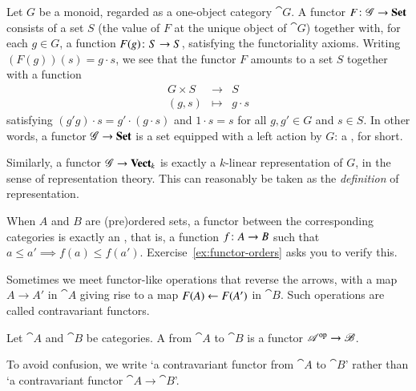 \begin{example}
\label{eg:functor-action}
Let $G$ be a monoid,%
%
%
regarded as a one-object category $\cat{G}$.  A functor $F\from \cat{G} \to
\Set$ consists of a set $S$ (the value of $F$ at the unique object of
$\cat{G}$) together with, for each $g \in G$, a function $F(g)\from S \to
S$, satisfying the functoriality axioms.  Writing $(F(g))(s) = g \cdot s$,
we see that the functor $F$ amounts to a set $S$ together with a function
\[
\begin{array}{ccc}
G \times S      &\to            &S      \\
(g, s)          &\mapsto        &g \cdot s      
\end{array}
\]
satisfying $(g' g) \cdot s = g' \cdot (g \cdot s)$ and $1 \cdot s = s$ for
all $g, g' \in G$ and $s \in S$.  In other words, a functor $\mathscr{G} \to
\mathbf{Set}$ is a set equipped with a left action by $G$: a ,%
%
%
for short.

Similarly, a functor $\mathscr{G} \to \mathbf{Vect}_k$ is exactly a $k$-linear
representation%
%
%
of $G$, in the sense of representation theory.  This can reasonably be
taken as the \emph{definition} of representation.
\end{example}

\begin{example}
\label{eg:functor-orders}
When $A$ and $B$ are (pre)ordered sets, a functor between the corresponding
categories is exactly an , that is, a function
$f\from A \to B$ such that $a \leq a' \implies f(a) \leq f(a')$.
Exercise~\ref{ex:functor-orders} asks you to verify this.
\end{example}

Sometimes we meet functor-like operations that reverse the arrows, with a
map $A \to A'$ in $\cat{A}$ giving rise to a map $F(A) \leftarrow F(A')$ in
$\cat{B}$.  Such operations are called contravariant functors.

\begin{defn}    
\label{defn:contravariant}
Let $\cat{A}$ and $\cat{B}$ be categories.  A  from $\cat{A}$ to $\cat{B}$ is a functor $\mathscr{A}^{\mathrm{op}} \to
\mathscr{B}$.
\end{defn}

To avoid confusion, we write `a contravariant functor from $\cat{A}$ to
$\cat{B}$' rather than `a contravariant functor $\cat{A} \to \cat{B}$'.

